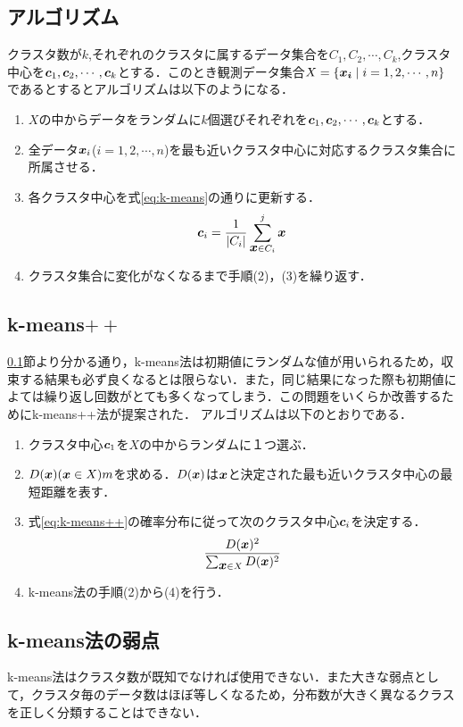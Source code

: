 \documentclass[a4j]{jsarticle}
\def\vec#1{\mbox{\boldmath $#1$}}
\begin{document}
\subsection{アルゴリズム}
\label{sec:km-algo}
クラスタ数が$k$,それぞれのクラスタに属するデータ集合を$C_1,C_2,\cdots,C_k$,クラスタ中心を$\vec c_1,\vec c_2,\cdots,\vec c_k$とする．このとき観測データ集合$X=\{\vec{x_i}\mid i=1,2,\cdots,n\}$であるとするとアルゴリズムは以下のようになる．
\begin{enumerate}
\item $X$の中からデータをランダムに$k$個選びそれぞれを$\vec c_1,\vec c_2,\cdots,\vec c_k$とする．
\item 全データ$\vec x_i$($i=1,2,\cdots,n$)を最も近いクラスタ中心に対応するクラスタ集合に所属させる．
\item 各クラスタ中心を式\ref{eq:k-means}の通りに更新する．
\begin{equation}
\vec c_i=\frac{1}{|C_i|}\sum_{\vec x \in C_i}^{j}\vec x
\label{eq:k-means}
\end{equation}
\item クラスタ集合に変化がなくなるまで手順(2)，(3)を繰り返す．
\end{enumerate}

\subsection{k-means$++$}
\ref{sec:km-algo}節より分かる通り，k-means法は初期値にランダムな値が用いられるため，収束する結果も必ず良くなるとは限らない．また，同じ結果になった際も初期値によては繰り返し回数がとても多くなってしまう．この問題をいくらか改善するためにk-means++法が提案された．
アルゴリズムは以下のとおりである．
\begin{enumerate}
\item クラスタ中心$\vec c_1$を$X$の中からランダムに１つ選ぶ．
\item $D(\vec x)(\vec x\in X)m$を求める．$D(\vec x)$は$\vec x$と決定された最も近いクラスタ中心の最短距離を表す．
\item 式\ref{eq:k-means++}の確率分布に従って次のクラスタ中心$\vec c_i$を決定する．
\begin{equation}
\frac{D(\vec x)^2}{\sum_{\vec x\in X}D(\vec x)^2}
\label{eq:k-means++}
\end{equation}
\item k-means法の手順(2)から(4)を行う．
\end{enumerate}

\subsection{k-means法の弱点}
k-means法はクラスタ数が既知でなければ使用できない．また大きな弱点として，クラスタ毎のデータ数はほぼ等しくなるため，分布数が大きく異なるクラスを正しく分類することはできない．
\end{document}
